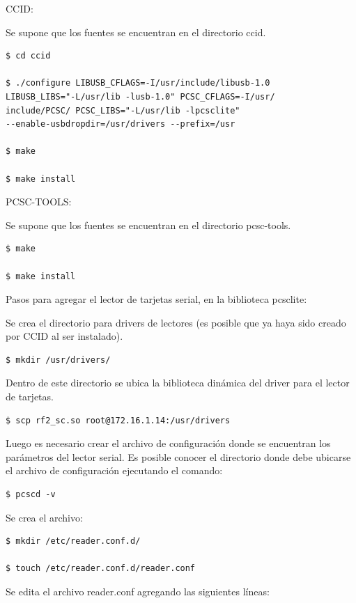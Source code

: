 CCID:

\bigskip
Se supone que los fuentes se encuentran en el directorio ccid.

\begin{verbatim}
$ cd ccid

$ ./configure LIBUSB_CFLAGS=-I/usr/include/libusb-1.0 
LIBUSB_LIBS="-L/usr/lib -lusb-1.0" PCSC_CFLAGS=-I/usr/
include/PCSC/ PCSC_LIBS="-L/usr/lib -lpcsclite" 
--enable-usbdropdir=/usr/drivers --prefix=/usr

$ make

$ make install
\end{verbatim}

PCSC-TOOLS:

\bigskip
Se supone que los fuentes se encuentran en el directorio pcsc-tools.

\begin{verbatim}
$ make

$ make install
\end{verbatim}

Pasos para agregar el lector de tarjetas serial, en la biblioteca pcsclite:

\bigskip
Se crea el directorio para drivers de lectores (es posible que ya haya sido creado por CCID al ser instalado). 

\begin{verbatim}
$ mkdir /usr/drivers/
\end{verbatim}

Dentro de este directorio se ubica la biblioteca dinámica del driver para el lector de tarjetas. 

\begin{verbatim} 
$ scp rf2_sc.so root@172.16.1.14:/usr/drivers
\end{verbatim}

Luego es necesario crear el archivo de configuración donde se encuentran los parámetros del lector serial. Es posible conocer el directorio donde debe ubicarse el archivo de configuración ejecutando el comando: 

\begin{verbatim}
$ pcscd -v
\end{verbatim}

Se crea el archivo: 

\begin{verbatim}
$ mkdir /etc/reader.conf.d/ 

$ touch /etc/reader.conf.d/reader.conf 
\end{verbatim}

Se edita el archivo reader.conf agregando las siguientes líneas: 

